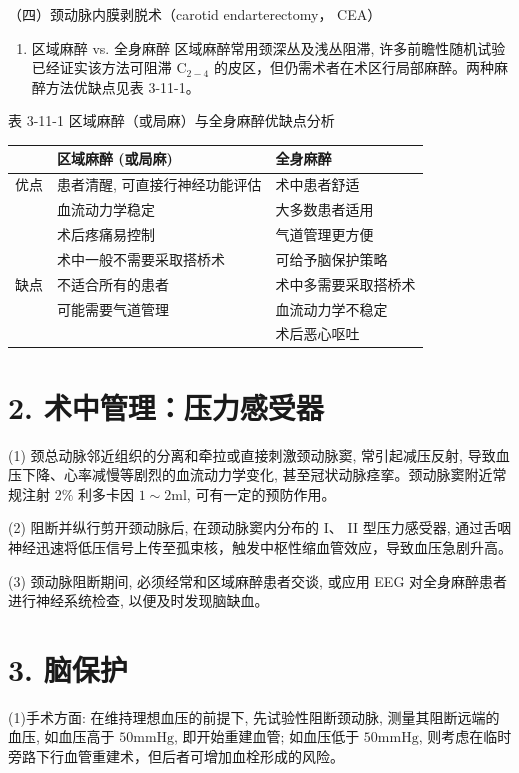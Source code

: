 \documentclass[10pt]{article}
\begin{document}
（四）颈动脉内膜剥脱术（carotid endarterectomy， CEA）

\begin{enumerate}
  \item 区域麻醉 vs. 全身麻醉 区域麻醉常用颈深丛及浅丛阻滞, 许多前瞻性随机试验已经证实该方法可阻滞 $\mathrm{C}_{2-4}$ 的皮区，但仍需术者在术区行局部麻醉。两种麻醉方法优缺点见表 3-11-1。
\end{enumerate}

表 3-11-1 区域麻醉（或局麻）与全身麻醉优缺点分析

\begin{center}
\begin{tabular}{lll}
\hline
 & 区域麻醉 (或局麻) & 全身麻醉 \\
\hline
优点 & 患者清醒, 可直接行神经功能评估 & 术中患者舒适 \\
 & 血流动力学稳定 & 大多数患者适用 \\
 & 术后疼痛易控制 & 气道管理更方便 \\
 & 术中一般不需要采取搭桥术 & 可给予脑保护策略 \\
缺点 & 不适合所有的患者 & 术中多需要采取搭桥术 \\
 & 可能需要气道管理 & 血流动力学不稳定 \\
 &  & 术后恶心呕吐 \\
\hline
\end{tabular}
\end{center}

\section*{2. 术中管理：压力感受器}
(1) 颈总动脉邻近组织的分离和牵拉或直接刺激颈动脉窦, 常引起减压反射, 导致血压下降、心率减慢等剧烈的血流动力学变化, 甚至冠状动脉痉挛。颈动脉窦附近常规注射 $2 \%$ 利多卡因 $1 \sim 2 \mathrm{ml}$, 可有一定的预防作用。

(2) 阻断并纵行剪开颈动脉后, 在颈动脉窦内分布的 I、 II 型压力感受器, 通过舌咽神经迅速将低压信号上传至孤束核，触发中枢性缩血管效应，导致血压急剧升高。

(3) 颈动脉阻断期间, 必须经常和区域麻醉患者交谈, 或应用 EEG 对全身麻醉患者进行神经系统检查, 以便及时发现脑缺血。

\section*{3. 脑保护}
(1)手术方面: 在维持理想血压的前提下, 先试验性阻断颈动脉, 测量其阻断远端的血压, 如血压高于 $50 \mathrm{mmHg}$, 即开始重建血管; 如血压低于 $50 \mathrm{mmHg}$, 则考虑在临时旁路下行血管重建术，但后者可增加血栓形成的风险。
\end{document}
